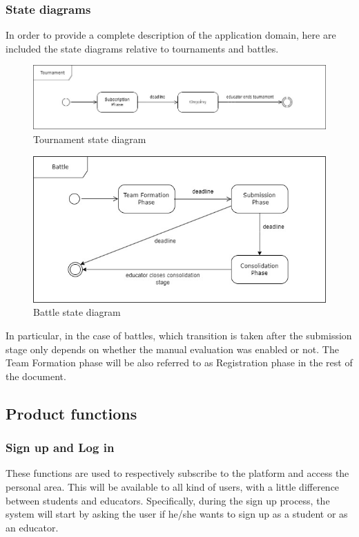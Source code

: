\subsubsection{State diagrams}
In order to provide a complete description of the application domain, here are included the state diagrams relative to tournaments and battles.
\begin{figure}[H]
    \hspace{-20px}
    \includegraphics[scale=0.5]{Diagrams/tournament_state.jpg}
    \caption{Tournament state diagram}
    \label{tournament_state}
\end{figure}
\begin{figure}[H]
    \hspace{35px}
    \includegraphics[scale=0.5]{Diagrams/battle_state.jpg}
    \caption{Battle state diagram}
    \label{battle_state}
\end{figure}
In particular, in the case of battles, which transition is taken after the submission stage only depends on whether the manual evaluation was enabled or not.
The Team Formation phase will be also referred to as Registration phase in the rest of the document.

\subsection{Product functions}
\subsubsection{Sign up and Log in}
These functions are used to respectively subscribe to the platform and access the personal area. This will be available to all kind of users, with a little difference between students and educators. Specifically, during the sign up process, the system will start by asking the user if he/she wants to sign up as a student or as an educator.

